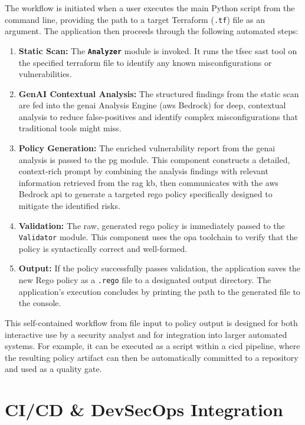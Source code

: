 The workflow is initiated when a user executes the main Python script from the command line, providing the path to a target Terraform (\texttt{.tf}) file as an argument. The application then proceeds through the following automated steps:

\begin{enumerate}
    \item \textbf{Static Scan:} The \textbf{\texttt{Analyzer}} module is invoked. It runs the tfsec \gls{sast} tool on the specified \gls{terraform} file to identify any known misconfigurations or vulnerabilities.
    \item \textbf{GenAI Contextual Analysis:} The structured findings from the static scan are fed into the \gls{genai} Analysis Engine (\gls{aws} Bedrock) for deep, contextual analysis to reduce \glspl{false-positive} and identify complex misconfigurations that traditional tools might miss.
    \item \textbf{Policy Generation:} The enriched vulnerability report from the \gls{genai} analysis is passed to the \gls{pg} module. This component constructs a detailed, context-rich prompt by combining the analysis findings with relevant information retrieved from the \gls{rag} \gls{kb}, then communicates with the \gls{aws} Bedrock \gls{api} to generate a targeted \gls{rego} policy specifically designed to mitigate the identified risks.
    \item \textbf{Validation:} The raw, generated \gls{rego} policy is immediately passed to the \texttt{Validator} module. This component uses the \gls{opa} toolchain to verify that the policy is syntactically correct and well-formed.
    \item \textbf{Output:} If the policy successfully passes validation, the application saves the new Rego policy as a \texttt{.rego} file to a designated output directory. The application's execution concludes by printing the path to the generated file to the console.
\end{enumerate}

This self-contained workflow from file input to policy output is designed for both interactive use by a security analyst and for integration into larger automated systems. For example, it can be executed as a script within a \gls{cicd} pipeline, where the resulting policy artifact can then be automatically committed to a repository and used as a quality gate.

\section{CI/CD \& DevSecOps Integration}

